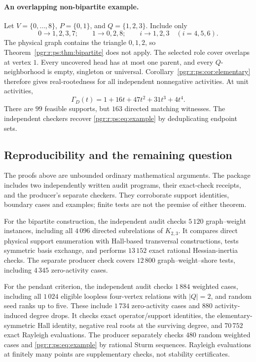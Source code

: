 \documentclass[11pt]{article}
\numberwithin{equation}{section}
\theoremstyle{definition}\newtheorem{definition}[theorem]{Definition}\newtheorem{remark}[theorem]{Remark}
\newcommand{\Ga}{\Gamma}                   %
\begin{document}
\paragraph{An overlapping non-bipartite example.}
Let $V=\{0,\ldots,8\}$, $P=\{0,1\}$, and $Q=\{1,2,3\}$. Include only
\[
 0\to1,2,3,7;\qquad 1\to0,2,8;\qquad
 i\to1,2,3\quad(i=4,5,6).
\]
The physical graph contains the triangle $0,1,2$, so Theorem~\ref{pgr:r:ps:thm:bipartite} does not apply. The selected role cover overlaps at vertex $1$. Every uncovered head has at most one parent, and every $Q$-neighborhood is empty, singleton or universal. Corollary~\ref{pgr:r:ps:cor:elementary} therefore gives real-rootedness for all independent nonnegative activities. At unit activities,
\begin{equation}\label{pgr:r:ps:eq:example}
 \Ga_D(t)=1+16t+47t^2+31t^3+4t^4.
\end{equation}
There are $99$ feasible supports, but $163$ directed matching witnesses. The independent checkers recover \eqref{pgr:r:ps:eq:example} by deduplicating endpoint sets.

\subsection{Reproducibility and the remaining question}
The proofs above are unbounded ordinary mathematical arguments. The package includes two independently written audit programs, their exact-check receipts, and the producer's separate checkers. They corroborate support identities, boundary cases and examples; finite tests are not the premise of either theorem.

For the bipartite construction, the independent audit checks $5\,120$ graph--weight instances, including all $4\,096$ directed subrelations of $K_{2,3}$. It compares direct physical support enumeration with Hall-based transversal constructions, tests symmetric basis exchange, and performs $13\,152$ exact rational Hessian-inertia checks. The separate producer check covers $12\,800$ graph--weight--shore tests, including $4\,345$ zero-activity cases.

For the pendant criterion, the independent audit checks $1\,884$ weighted cases, including all $1\,024$ eligible loopless four-vertex relations with $|Q|=2$, and random seed ranks up to five. These include $1\,734$ zero-activity cases and $880$ activity-induced degree drops. It checks exact operator/support identities, the elementary-symmetric Hall identity, negative real roots at the surviving degree, and $70\,752$ exact Rayleigh evaluations. The producer separately checks $480$ random weighted cases and \eqref{pgr:r:ps:eq:example} by rational Sturm sequences. Rayleigh evaluations at finitely many points are supplementary checks, not stability certificates.
\end{document}
